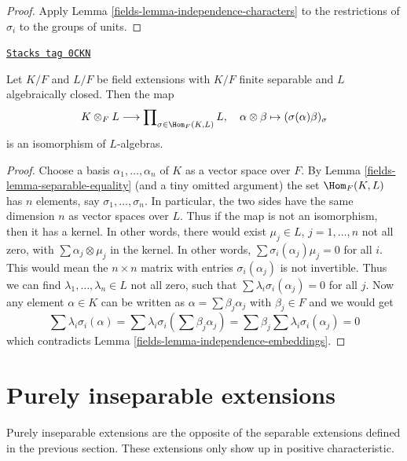 \begin{proof}

Apply Lemma \ref{fields-lemma-independence-characters} to
the restrictions of $\sigma_i$ to the groups of units.
\end{proof}

\begin{lemma}
\label{fields-lemma-finite-separable-tensor-alg-closed}
\href{https://stacks.math.columbia.edu/tag/0CKN}{\texttt{Stacks tag 0CKN}}

Let $K/F$ and $L/F$ be field extensions with
$K/F$ finite separable and $L$ algebraically closed.
Then the map
$$
K \otimes_F L
\longrightarrow
\prod\nolimits_{\sigma \in \Hom_F(K, L)} L,\quad
\alpha \otimes \beta \mapsto (\sigma(\alpha)\beta)_\sigma
$$
is an isomorphism of $L$-algebras.
\end{lemma}

\begin{proof}

Choose a basis $\alpha_1, \ldots, \alpha_n$ of $K$ as a vector space over $F$.
By Lemma \ref{fields-lemma-separable-equality} (and a tiny omitted argument) the set
$\Hom_F(K, L)$ has $n$ elements, say $\sigma_1, \ldots, \sigma_n$.
In particular, the two sides have the same dimension $n$ as vector
spaces over $L$. Thus if the map is not an isomorphism, then it
has a kernel. In other words, there would exist
$\mu_j \in L$, $j = 1, \ldots, n$ not all zero,
with $\sum \alpha_j \otimes \mu_j$ in the kernel.
In other words, $\sum \sigma_i(\alpha_j)\mu_j = 0$ for all $i$.
This would mean the $n \times n$ matrix with entries
$\sigma_i(\alpha_j)$ is not invertible. Thus we can find
$\lambda_1, \ldots, \lambda_n \in L$ not all zero,
such that $\sum \lambda_i\sigma_i(\alpha_j) = 0$ for all $j$.
Now any element $\alpha \in K$ can be written as
$\alpha = \sum \beta_j \alpha_j$ with $\beta_j \in F$ and we would get
$$
\sum \lambda_i\sigma_i(\alpha) =
\sum \lambda_i\sigma_i(\sum \beta_j \alpha_j) =
\sum \beta_j \sum \lambda_i\sigma_i(\alpha_j) = 0
$$
which contradicts Lemma \ref{fields-lemma-independence-embeddings}.
\end{proof}

\section{Purely inseparable extensions}
\label{fields-section-purely-inseparable}
Purely inseparable extensions are the opposite of the separable
extensions defined in the previous section. These extensions only
show up in positive characteristic.

